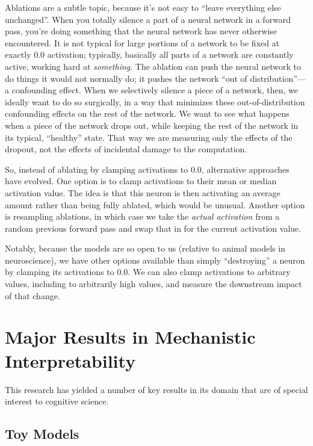Ablations are a subtle topic, because it's not easy to ``leave everything else
unchanged''. When you totally silence a part of a neural network in a forward
pass, you're doing something that the neural network has never otherwise
encountered. It is not typical for large portions of a network to be fixed at
exactly $0.0$ activation; typically, basically all parts of a network are
constantly active, working hard at \emph{something}. The ablation can push the
neural network to do things it would not normally do; it pushes the network
``out of distribution''---a confounding effect. When we selectively silence a
piece of a network, then, we ideally want to do so surgically, in a way that
minimizes these out-of-distribution confounding effects on the rest of the
network. We want to see what happens when a piece of the network drops out,
while keeping the rest of the network in its typical, ``healthy''
state. That way we are measuring only the effects of the dropout, not the
effects of incidental damage to the computation.

So, instead of ablating by clamping activations to $0.0$, alternative
approaches have evolved. One option is to clamp activations to their mean or
median activation value. The idea is that this neuron is then activating an
average amount rather than being fully ablated, which would be unusual. Another
option is resampling ablations, in which case we take the \emph{actual
activation} from a random previous forward pass and swap that in for the
current activation value.

Notably, because the models are so open to us (relative to animal models in
neuroscience), we have other options available than simply ``destroying'' a
neuron by  clamping its activations to  $0.0$. We can also clamp activations to
arbitrary values, including to arbitrarily high values, and measure the
downstream impact of that change.

\section{Major Results in Mechanistic Interpretability}

This research has yielded a number of key results in
its domain that are of special interest to cognitive science.

\subsection{Toy Models}

